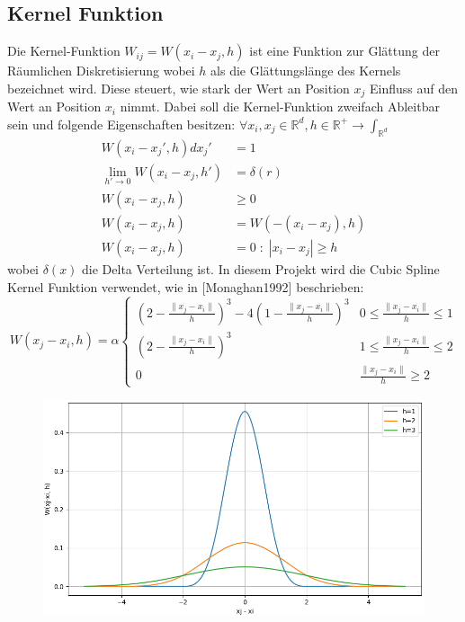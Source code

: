 \documentclass[a4paper, 12pt]{article}
\begin{document}
\subsection{Kernel Funktion}
Die Kernel-Funktion \(W_{ij} = W(x_i - x_j, h)\) ist eine Funktion zur Glättung der Räumlichen Diskretisierung wobei \(h\) als die Glättungslänge des Kernels bezeichnet wird. Diese steuert, wie stark der Wert an Position \(x_j\) Einfluss auf den Wert an Position \(x_i\) nimmt. Dabei soll die Kernel-Funktion zweifach Ableitbar sein und folgende Eigenschaften besitzen: \(\forall x_i, x_j \in \mathds{R}^d, h\in \mathds{R}^+ \rightarrow \int_{\mathds{R}^d}\)
\begin{align}
	W(x_i - x_j', h) dx_j' &= 1 \label{kernelEigenschaft1}\\
	\lim_{h'\rightarrow 0} W(x_i - x_j, h') &= \delta(r) \label{kernelEigenschaft2}\\
	W(x_i - x_j, h) &\geq 0 \label{kernelEigenschaft3}\\
	W(x_i - x_j, h) &= W(-(x_i - x_j), h) \label{kernelEigenschaft4}\\
	W(x_i - x_j, h) &= 0\;:\; |x_i - x_j| \geq h \label{kernelEigenschaft5}
\end{align}
wobei \(\delta(x)\) die Delta Verteilung ist. 
In diesem Projekt wird die Cubic Spline Kernel Funktion verwendet, wie in [Monaghan1992] beschrieben:
\begin{equation*}
	W(x_j - x_i, h) = \alpha \begin{cases} 
	(2-\frac{\|x_j - x_i\|}{h})^3 - 4(1-\frac{\|x_j - x_i\|}{h})^3 & 0 \leq \frac{\|x_j - x_i\|}{h} \leq 1\\
	(2-\frac{\|x_j - x_i\|}{h})^3 & 1 \leq \frac{\|x_j - x_i\|}{h} \leq 2 \\
	0 & \frac{\|x_j - x_i\|}{h} \geq 2 
	\end{cases}
\end{equation*}

\begin{figure}[H]
	\centering
	\includegraphics[width=\textwidth]{graphics/KernelPlot.png}
\end{figure}
\end{document}
